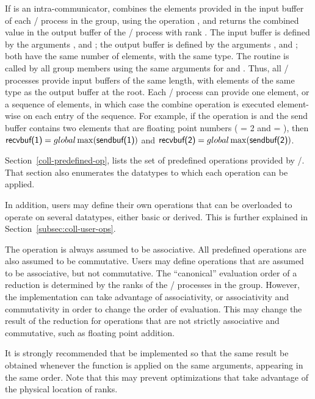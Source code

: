 If  is an intra-communicator,
 combines the elements provided
in the input buffer of each \MPI/ process in the
group, using the operation , and returns the combined value in
the output buffer of the \MPI/ process with rank .
The input buffer is defined by the arguments ,
 and ; the output buffer is defined by
the arguments ,  and ;
both have the same number of elements, with the same type.
The routine is called by all group members using the same arguments
for  and .
Thus, all \MPI/ processes provide input buffers of the
same length, with elements of the same type as the output buffer at the root.
Each \MPI/ process can provide one element, or a sequence of elements,
in which case the
combine operation is executed element-wise on each entry of the sequence.
For example, if the operation is  and the send buffer
contains two elements that are floating point numbers ( = 2 and
 = ), then $\textsf{recvbuf(1)} =
global \max (\textsf{sendbuf(1)})$ and $\textsf{recvbuf(2)} = global \max ( \textsf{sendbuf(2)})$.

Section~\ref{coll-predefined-op}, lists the set of predefined operations
provided by \MPI/. That section also enumerates
the datatypes
to which each operation can be applied.

In addition, users may define their own operations that can be
overloaded to operate on several datatypes, either basic or derived.
This is further explained in Section~\ref{subsec:coll-user-ops}.

The operation  is always assumed to be
associative.  All predefined operations are also assumed to be
commutative.  Users may define operations that are assumed to be
associative, but not commutative.  The ``canonical'' evaluation order
of a reduction is determined by the ranks of the \MPI/ processes in the
group.  However, the implementation can take
advantage of associativity, or associativity and commutativity
in order to change the order of evaluation.
This may change the result of the reduction for operations that are not
strictly associative and commutative, such as floating point addition.


\begin{implementors}
It is strongly recommended that  be implemented so
that the same result be obtained
whenever the function is applied on the same arguments,
appearing in the same order.  Note that this may
prevent optimizations that take
advantage of the physical location of ranks.
\end{implementors}

